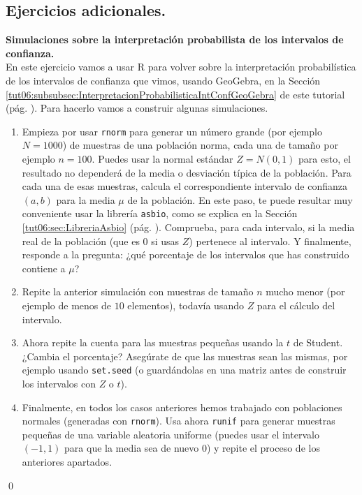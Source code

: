\documentclass[10pt,a4paper]{article}\usepackage[]{graphicx}\usepackage[]{color}
\newcounter {cont01}
\begin{document}
\subsection*{Ejercicios adicionales.}
\label{tut06:subsec:EjerciciosAdicionales}

\begin{ejercicio}
\label{tut06:ejercicio26}


{\bf Simulaciones sobre  la interpretación probabilista de los intervalos de confianza.}\\
\noindent
En este ejercicio vamos a usar R para volver sobre la interpretación probabilística de los intervalos de confianza que vimos, usando GeoGebra, en la Sección \ref{tut06:subsubsec:InterpretacionProbabilisticaIntConfGeoGebra} de este tutorial (pág. \pageref{tut06:subsubsec:InterpretacionProbabilisticaIntConfGeoGebra}). Para hacerlo vamos a construir algunas simulaciones.

\begin{enumerate}
  \item Empieza por usar {\tt rnorm} para generar un número grande (por ejemplo $N=1000$) de muestras de una población norma, cada una de tamaño por ejemplo $n=100$. Puedes usar la normal estándar $Z=N(0, 1)$ para esto, el resultado no dependerá de la media o desviación típica de la población. Para cada una de esas muestras, calcula el correspondiente intervalo de confianza $(a, b)$ para la media $\mu$ de la población. En este paso, te puede resultar muy conveniente usar la librería {\tt asbio}, como se explica en la Sección \ref{tut06:sec:LibreriaAsbio} (pág. \pageref{tut06:sec:LibreriaAsbio}). Comprueba, para cada intervalo, si la media real de la población (que es $0$ si usas $Z$) pertenece al intervalo. Y finalmente, responde a la pregunta: ¿qué porcentaje de los intervalos que has construido contiene a $\mu$?
  \item Repite la anterior simulación con muestras de tamaño $n$ mucho menor (por ejemplo de menos de $10$ elementos), todavía usando $Z$ para el cálculo del intervalo.
  \item Ahora repite la cuenta para las muestras pequeñas usando la $t$ de Student. ¿Cambia el porcentaje? Asegúrate de que las muestras sean las mismas, por ejemplo  usando {\tt set.seed} (o guardándolas en una matriz antes de construir los intervalos con $Z$ o $t$).
  \item Finalmente, en todos los casos anteriores hemos trabajado con poblaciones normales (generadas con {\tt rnorm}). Usa ahora {\tt runif} para generar muestras pequeñas de una variable aleatoria uniforme (puedes usar el intervalo $(-1, 1)$ para que la media sea de nuevo $0$) y repite el proceso de los anteriores apartados.
\end{enumerate}
\qed
\end{ejercicio}
\end{document}
